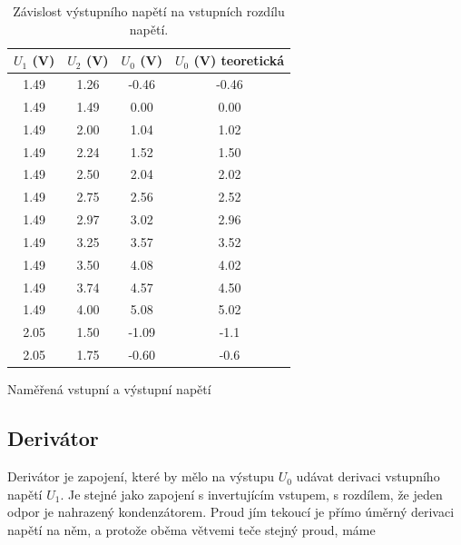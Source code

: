 \documentclass[a4paper,11pt]{article}
\begin{document}
\begin{table}[h]
    \begin{minipage}[b]{.45\linewidth}
        \centering
        \begin{tabular}{ | c c c c | }
            \hline
            $ U_1 $ (V) & $ U_2 $ (V) & $ U_0 $ (V) & $ U_0 $ (V) teoretická\\
            \hline
            1.49 & 1.26 & -0.46 & -0.46 \\
            1.49 & 1.49 & 0.00  & 0.00   \\
            1.49 & 2.00 & 1.04  & 1.02 \\
            1.49 & 2.24 & 1.52  & 1.50  \\
            1.49 & 2.50 & 2.04  & 2.02 \\
            1.49 & 2.75 & 2.56  & 2.52 \\
            1.49 & 2.97 & 3.02  & 2.96 \\
            1.49 & 3.25 & 3.57  & 3.52 \\
            1.49 & 3.50 & 4.08  & 4.02 \\
            1.49 & 3.74 & 4.57  & 4.50  \\
            1.49 & 4.00 & 5.08  & 5.02 \\
            2.05 & 1.50 & -1.09 & -1.1 \\
            2.05 & 1.75 & -0.60 & -0.6 \\
            \hline
        \end{tabular}
        \caption{Naměřená vstupní a výstupní napětí}
    \end{minipage} 
    \hfill
    \begin{minipage}[b]{.45\linewidth}
        \centering
        \resizebox{\textwidth}{!}{  }
        \captionsetup{type=graph}
        \caption{Závislost výstupního napětí na vstupních rozdílu napětí.}
    \end{minipage} 
\end{table}

\newpage

\subsection{Derivátor}

Derivátor je zapojení, které by mělo na výstupu $ U_0 $ udávat derivaci vstupního napětí $ U_1 $. Je stejné jako zapojení s invertujícím vstupem, s rozdílem, že jeden odpor je nahrazený kondenzátorem. Proud jím tekoucí je přímo úměrný derivaci napětí na něm, a protože oběma větvemi teče stejný proud, máme
\end{document}
